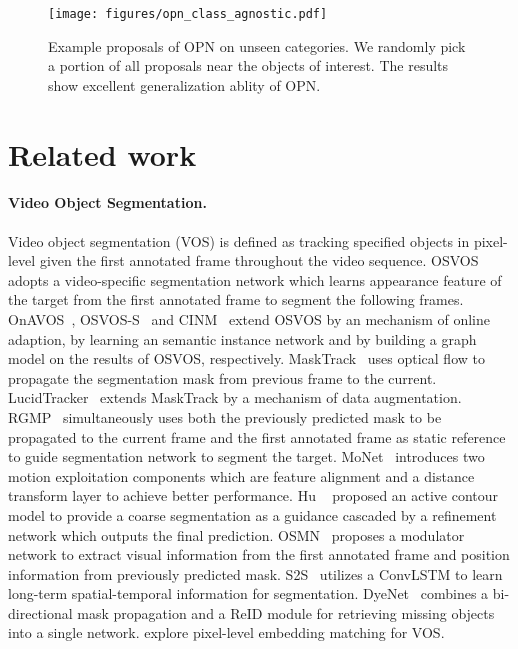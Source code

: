\documentclass[10pt,twocolumn,letterpaper]{article}
\begin{document}
\begin{figure*}[htp]
\centering
    	\texttt{[image: figures/opn\_class\_agnostic.pdf]}
    	\caption{Example proposals of OPN on unseen categories. We randomly pick a portion of all proposals near the objects of interest. The results show excellent generalization ablity of OPN.}
    	\label{fig:opn_class_agnostic}
\end{figure*}

\section{Related work} \label{Related work}

\paragraph{Video Object Segmentation.}
    Video object segmentation (VOS) is defined as tracking specified objects in pixel-level given the first annotated frame throughout the video sequence. OSVOS~\cite{osvos_cvpr17} adopts a video-specific segmentation network which learns appearance feature of the target from the first annotated frame to segment the following frames. OnAVOS~\cite{onavos_bmvc17, davis17_arxiv17}, OSVOS-S~\cite{vos_wo_tempinfo_pami18} and CINM~\cite{cnn_in_mrf_cvpr18} extend OSVOS by an mechanism of online adaption,  by learning an semantic instance network and by building a graph model on the results of OSVOS, respectively. MaskTrack~\cite{masktrack_cvpr17} uses optical flow to propagate the segmentation mask from previous frame to the current. LucidTracker~\cite{lucid_datadreaming_arxiv18} extends MaskTrack by a mechanism of data augmentation. RGMP~\cite{rgmp_cvpr18} simultaneously uses both the previously predicted mask to be propagated to the current frame and the first annotated frame as static reference to guide segmentation network to segment the target. MoNet~\cite{monet_cvpr18} introduces two motion exploitation components which are feature alignment and a distance transform layer to achieve better performance. Hu \etal~\cite{motion_guided_vos_cvpr18} proposed an active contour model to provide a coarse segmentation as a guidance cascaded by a refinement network which outputs the final prediction. OSMN~\cite{Yang2018osmn} proposes a modulator network to extract visual information from the first annotated frame and position information from previously predicted mask. S2S~\cite{yvos_eccv18} utilizes a ConvLSTM to learn long-term spatial-temporal information for segmentation. DyeNet~\cite{dyenet_eccv18} combines a bi-directional mask propagation and a ReID module for retrieving missing objects into a single network. \cite{pml_cvpr18, vos_by_lse_eccv18, videomatch_eccv18} explore pixel-level embedding matching for VOS.
    
\end{document}
